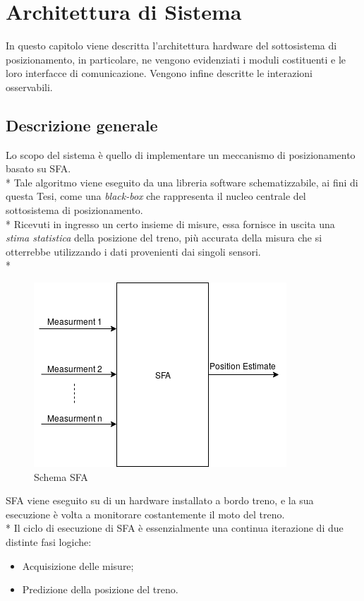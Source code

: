 \chapter{Architettura di Sistema}
In questo capitolo viene descritta l'architettura hardware del sottosistema di posizionamento, in particolare, ne vengono evidenziati i moduli costituenti e le loro interfacce di comunicazione. Vengono infine descritte le interazioni osservabili.
\section{Descrizione generale}
Lo scopo del sistema \`e quello di implementare un meccanismo di posizionamento basato su SFA.\\*
Tale algoritmo viene eseguito da una libreria software schematizzabile, ai fini di questa Tesi, come una \emph{black-box} che rappresenta il nucleo centrale del sottosistema di posizionamento.\\*
Ricevuti in ingresso un certo insieme di misure, essa fornisce in uscita una \emph{stima statistica} della posizione del treno, pi\`u accurata della misura che si otterrebbe utilizzando i dati provenienti dai singoli sensori.\cite{datafuse} \\*
\begin{figure}[h]
	\centering
	\includegraphics[scale=0.6]{img/sfaschema}
	\caption{Schema SFA}
	\label{fig:sfa}
\end{figure}
\clearpage
SFA viene eseguito su di un hardware installato a bordo treno, e la sua esecuzione \`e volta a monitorare costantemente il moto del treno.\\*
Il ciclo di esecuzione di SFA \`e essenzialmente una continua iterazione di due distinte fasi logiche:
\begin{itemize}
	\item Acquisizione delle misure;
	\item Predizione della posizione del treno.
\end{itemize}
